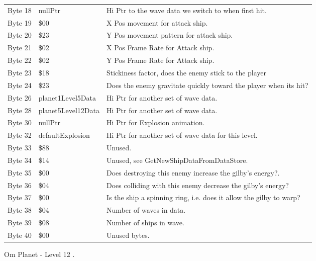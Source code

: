 \begin{figure}[H]
{\begin{adjustbox}{width=12cm}
\begin{tabular}{lll}
 Byte 18 & nullPtr                 & Hi Ptr to the wave data we switch to when first hit.               \\
 Byte 19 & \$00                     & X Pos movement for attack ship.                                    \\
 Byte 20 & \$23                     & Y Pos movement pattern for attack ship.                            \\
 Byte 21 & \$02                     & X Pos Frame Rate for Attack ship.                                  \\
 Byte 22 & \$02                     & Y Pos Frame Rate for Attack ship.                                  \\
 Byte 23 & \$18                     & Stickiness factor, does the enemy stick to the player              \\
 Byte 24 & \$23                     & Does the enemy gravitate quickly toward the player when its hit?   \\
 Byte 26 & planet1Level5Data       & Hi Ptr for another set of wave data.                               \\
 Byte 28 & planet5Level12Data      & Hi Ptr for another set of wave data.                               \\
 Byte 30 & nullPtr                 & Hi Ptr for Explosion animation.                                    \\
 Byte 32 & defaultExplosion        & Hi Ptr for another set of wave data for this level.                \\
 Byte 33 & \$88                     & Unused.                                                            \\
 Byte 34 & \$14                     & Unused, see GetNewShipDataFromDataStore.                           \\
 Byte 35 & \$00                     & Does destroying this enemy increase the gilby's energy?.           \\
 Byte 36 & \$04                     & Does colliding with this enemy decrease the gilby's energy?        \\
 Byte 37 & \$00                     & Is the ship a spinning ring, i.e. does it allow the gilby to warp? \\
 Byte 38 & \$04                     & Number of waves in data.                                           \\
 Byte 39 & \$08                     & Number of ships in wave.                                           \\
 Byte 40 & \$00                     & Unused bytes.                                                      \\
\bottomrule
\end{tabular}

  \end{adjustbox}

  }\caption*{Om Planet - Level 12
.}
\end{figure}

